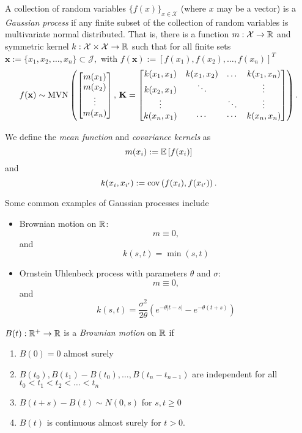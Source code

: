 \begin{definition}\label{def:gp}
    A collection of random variables $\{f(x)\}_{x\in\mathcal{X}}$
    (where $x$ may be a vector) is a \emph{Gaussian process} if any finite
    subset of the collection of random variables is multivariate normal
    distributed. That is, there is a function $m:\mathcal{X}\to\mathbb{R}$ and
    symmetric kernel $k:\mathcal{X}\times\mathcal{X}\to \mathbb{R}$ such that for all
    finite sets
    $\mathbf{x} :=\{x_1, x_2, \dots, x_n\} \subset \mathcal{J},$ with
    $f(\mathbf{x}) := [f(x_1), f(x_2), \dots, f(x_n)]^T$
    $$f(\mathbf{x}) \sim
        \operatorname{MVN}\left(\begin{bmatrix}
            m(x_1) \\ m(x_2)\\ \vdots\\ m(x_n)
        \end{bmatrix},\, \mathbf{K} = \begin{bmatrix}
            k(x_1, x_1) & k(x_1, x_2) & \dots  & k(x_1, x_n) \\
            k(x_2, x_1) & \ddots      &        & \vdots      \\
            \vdots      &             & \ddots & \vdots      \\
            k(x_n, x_1) & \cdots      & \cdots & k(x_n, x_n)
        \end{bmatrix}\right).$$
\end{definition}

\begin{definition}\label{def:mean_kernel}
    We define the \emph{mean function} and \emph{covariance kernels} as
    $$m(x_i) := \operatorname{\mathbb{E}}\left[f(x_i)\right]$$ and
    $$k(x_{i}, x_{i^\prime}) := \operatorname{cov}\left(f(x_i), f(x_{i^\prime})\right).$$
\end{definition}

Some common examples of Gaussian processes include \begin{itemize}
    \item Brownian motion on $\mathbb{R}$: $$m\equiv 0,$$ and $$k(s, t) = \min(s, t)$$
    \item Ornstein Uhlenbeck process with parameters $\theta$ and $\sigma$:
          $$m\equiv 0,$$ and
          $$k(s, t)
              = \frac{\sigma^2}{2\theta}
              \left(e^{-\theta|t - s|} - e^{-\theta(t + s)}\right)$$
\end{itemize}

\begin{definition}
    $B(t):\mathbb{R}^+ \to \mathbb{R}$ is a \emph{Brownian motion} on $\mathbb{R}$ if\begin{enumerate}
        \item $B(0) = 0$ almost surely
        \item $B(t_0), B(t_1) - B(t_0), \dots, B(t_n - t_{n-1})$ are
              independent for all $t_0<t_1<t_2<\dots<t_n$
        \item $B(t + s) - B(t)\sim N(0, s)$ for $s, t \geq 0$
        \item $B(t)$ is continuous almost surely for $t>0.$
    \end{enumerate}
\end{definition}

